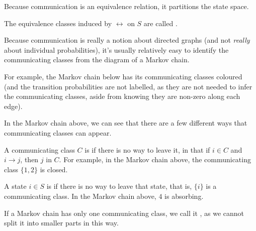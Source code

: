 \documentclass[a4paper]{scrartcl}
\begin{document}
Because communication is an equivalence relation, it partitions the state space.

\begin{definition}
	The equivalence classes induced by $\longleftrightarrow$ on $S$ are called .
\end{definition}

Because communication is really a notion about directed graphs (and not \emph{really} about individual probabilities), it's usually relatively easy to identify the communicating classes from the diagram of a Markov chain.

For example, the Markov chain below has its communicating classes coloured (and the transition probabilities are not labelled, as they are not needed to infer the communicating classes, aside from knowing they are non-zero along each edge).

\begin{center}
\end{center}

In the Markov chain above, we can see that there are a few different ways that communicating classes can appear.

A communicating class $C$ is  if there is no way to leave it, in that if $i \in C$ and $i \rightarrow j$, then $j$ in $C$. For example, in the Markov chain above, the communicating class $\{1, 2\}$ is closed.

A state $i \in S$ is  if there is no way to leave that state, that is, $\{i\}$ is a communicating class. In the Markov chain above, $4$ is absorbing.

If a Markov chain has only one communicating class, we call it , as we cannot split it into smaller parts in this way.
\end{document}
